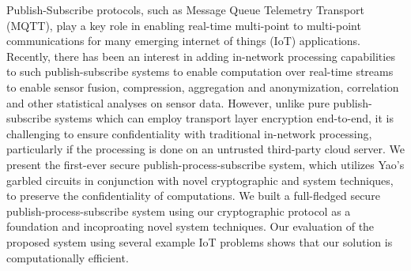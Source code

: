 Publish-Subscribe protocols, such as Message Queue Telemetry Transport (MQTT),
play a key role in enabling real-time multi-point to multi-point communications
for many emerging internet of things (IoT) applications. Recently, there has
been an interest in adding in-network processing capabilities to such
publish-subscribe systems to enable computation over real-time streams to
enable sensor fusion, compression, aggregation and anonymization, correlation
and other statistical analyses on sensor data.  However, unlike pure
publish-subscribe systems which can employ transport layer encryption
end-to-end, it is challenging to ensure confidentiality with traditional
in-network processing, particularly if the processing is done on an untrusted
third-party cloud server. We present the first-ever secure
publish-process-subscribe system, which utilizes Yao's garbled circuits in
conjunction with novel cryptographic and system techniques, to preserve the
confidentiality of computations. We built a full-fledged secure
publish-process-subscribe system using our cryptographic protocol as a
foundation and incoproating novel system techniques. Our evaluation of the
proposed system using several example IoT problems shows that our solution is
computationally efficient.
